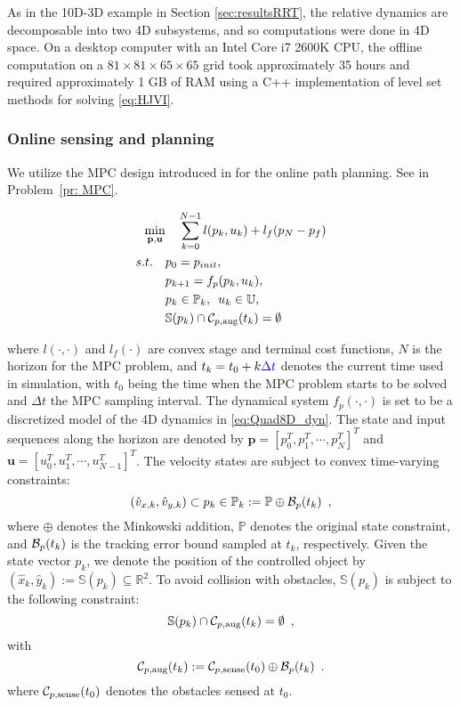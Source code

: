 As in the 10D-3D example in Section \ref{sec:resultsRRT}, the relative dynamics are decomposable into two 4D subsystems, and so computations were done in 4D space.
On a desktop computer with an Intel Core i7 2600K CPU, the offline computation on a $81\times81\times65\times65$ grid took approximately 35 hours and  required approximately 1 GB of RAM using a C++ implementation of level set methods for solving \eqref{eq:HJVI}.

\subsubsection{Online sensing and planning}
%
We utilize the MPC design introduced in \cite{Zhang2017} for the online path planning. See in Problem~\ref{pr: MPC}.
%
\begin{problem}\label{pr: MPC}
\begin{align*}
\min_{\mathbf{p},\mathbf{u}}  & \quad \sum^{N-1}_{k=0} l(p_k,u_k) + l_f(p_N-p_f)  \\
s.t. \quad & p_0 = p_{init},\\
&p_{k+1} = f_p(p_k,u_k),\\
& p_k \in \mathbb{P}_k ,\enspace u_k \in \mathbb{U},\\
& \mathbb{S}(p_k)\cap\mathcal C_{p,\text{aug}}(t_k) = \emptyset
\end{align*}
\end{problem}
where $l(\cdot,\cdot)$ and $l_f(\cdot)$ are convex stage and terminal cost functions, $N$ is the horizon for the MPC problem, and $t_k = t_0 + k \textcolor{blue}{\Delta t}$ denotes the current time used in simulation, with $t_0$ being the time when the MPC problem starts to be solved and $\Delta t$ the MPC sampling interval. The dynamical system $f_p(\cdot,\cdot)$ is set to be a discretized model of the 4D dynamics in \eqref{eq:Quad8D_dyn}. The state and input sequences along the horizon  are denoted by $\mathbf{p}=[p^{T}_0,p^{T}_1,\cdots,p^{T}_N]^{T}$ and $\mathbf{u}=[u^{T}_0,u^{T}_1,\cdots,u^{T}_{N-1}]^{T}$. The velocity states are subject to convex time-varying constraints:
%
\begin{equation}
(\hat v_{x,k},\hat v_{y,k}) \subset p_k \in \mathbb{P}_k :=\mathbb{P}\oplus\mathcal B_p(t_k) \enspace ,
\end{equation}
%
where $\oplus$ denotes the Minkowski addition, $\mathbb{P}$ denotes the original state constraint, and $\mathcal B_p(t_k)$ is the tracking error bound sampled at $t_k$, respectively. Given the state vector $p_k$, we denote the position of the controlled object by $(\hat x_k,\hat y_k) := \mathbb{S}(p_k)\subseteq \mathbb{R}^{2}$. To avoid collision with obstacles, $\mathbb{S}(p_k)$ is subject to the following constraint: 
%
\begin{equation}
\mathbb{S}(p_k)\cap\mathcal C_{p,\text{aug}}(t_k) = \emptyset \enspace ,
\end{equation}
%
with 
%
\begin{equation}
\mathcal C_{p,\text{aug}}(t_k) := \mathcal C_{p,\text{sense}}(t_0)\oplus\mathcal B_p(t_k) \enspace .
\end{equation}
%
where $\mathcal C_{p,\text{sense}}(t_0)$ denotes the obstacles sensed at $t_0$.

